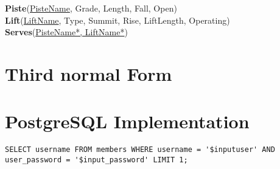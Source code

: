 \documentclass[titlepage ,12pt]{article}
\begin{document}
\textbf{Piste}(\underline{PisteName}, Grade, Length, Fall, Open) \\
\textbf{Lift}(\underline{LiftName}, Type, Summit, Rise, LiftLength, Operating) \\
\textbf{Serves}(\underline{PisteName*, LiftName*})

\section{Third normal Form}

\section{PostgreSQL Implementation}

\begin{lstlisting}[breaklines=true]
  SELECT username FROM members WHERE username = '$inputuser' AND user_password = '$input_password' LIMIT 1;
\end{lstlisting}
\end{document}

